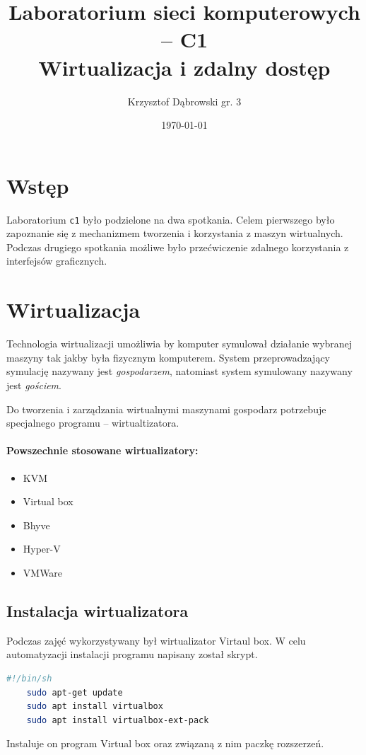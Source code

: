 \documentclass{article}
\title{Laboratorium sieci komputerowych -- C1 \\ Wirtualizacja i zdalny dostęp}
\author{Krzysztof Dąbrowski gr. 3}
\date{\today}
\begin{document}
\maketitle{}
\tableofcontents{}
\newpage

\section{Wstęp}
Laboratorium \texttt{c1} było podzielone na dwa spotkania. Celem pierwszego było zapoznanie się z mechanizmem tworzenia i korzystania z maszyn wirtualnych. Podczas drugiego spotkania możliwe było przećwiczenie zdalnego korzystania z interfejsów graficznych.

\section{Wirtualizacja}
Technologia wirtualizacji umożliwia by komputer symulował działanie wybranej maszyny tak jakby była fizycznym komputerem. System przeprowadzający symulację nazywany jest \textit{gospodarzem}, natomiast system symulowany nazywany jest \textit{gościem}.

Do tworzenia i zarządzania wirtualnymi maszynami gospodarz potrzebuje specjalnego programu -- wirtualtizatora.

\paragraph{Powszechnie stosowane wirtualizatory:}
\begin{itemize}
    \item KVM
    \item Virtual box
    \item Bhyve
    \item Hyper-V
    \item VMWare
\end{itemize}

\subsection{Instalacja wirtualizatora}
Podczas zajęć wykorzystywany był wirtualizator Virtaul box. W celu automatyzacji instalacji programu napisany został skrypt.
\begin{lstlisting}[language=sh]
    #!/bin/sh
    sudo apt-get update
    sudo apt install virtualbox
    sudo apt install virtualbox-ext-pack 
\end{lstlisting}
Instaluje on program Virtual box oraz związaną z nim paczkę rozszerzeń. 
\end{document}
